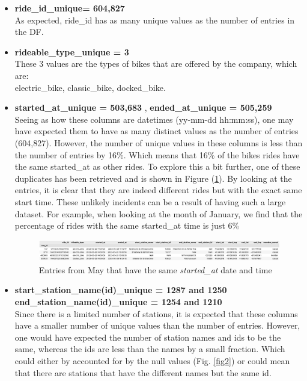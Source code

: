 \documentclass[12pt]{article}
\begin{document}
	\begin{itemize}
	\item \textbf{ride\_id\_unique= 604,827}   \\
	As expected, ride\_id has as many unique values as the number of entries in the DF.
	\item \textbf{rideable\_type\_unique = 3}  \\
	These 3 values are the types of bikes that are offered by the company, which are: \\
	electric\_bike, classic\_bike, docked\_bike.
	\item \textbf{started\_at\_unique = 503,683} , \textbf{ended\_at\_unique = 505,259} \\
	Seeing as how these columns are datetimes (yy-mm-dd hh:mm:ss), one may have expected them to have as many distinct values as the number of entries (604,827). However, the number of unique values in these columns is less than the number of entries by 16\%. Which means that 16\% of the bikes rides have the same started\_at as other rides. To explore this a bit further, one of these duplicates has been retrieved and is shown in Figure (\underline{\ref{fig10}}). By looking at the entries, it is clear that they are indeed different rides but with the exact same start time. These unlikely incidents can be a result of having such a large dataset. For example, when looking at the month of January, we find that the percentage of rides with the same started\_at time is just 6\%  \\
	
	\begin{figure}[h]
	\hspace{0.3in}
	\includegraphics[scale=0.4]{imgDups1.png}
	\caption{Entries from May that have the same \textit{started\_at} date and time}
	\label{fig10}
	\end{figure}
	
	\item \textbf{start\_station\_name(id)\_unique = 1287 and 1250}\\
	 \textbf{end\_station\_name(id)\_unique = 1254 and 1210} \\
	Since there is a limited number of stations, it is expected that these columns have a smaller number of unique values than the number of entries. However, one would have expected the number of station names and ids to be the same, whereas the ids are less than the names by a small fraction. Which could either by accounted for by the null values (Fig. \underline{\ref{fig2}}) or could mean that there are stations that have the different names but the same id.
	

\end{itemize}
\end{document}
